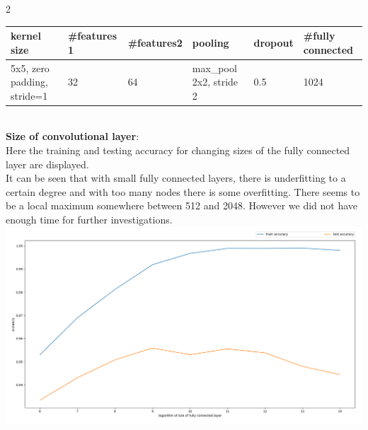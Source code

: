 \documentclass{article}
\begin{document}
\begin{ukon-infie}[3.12.17]{2}
\begin{exercise}[p=55]{}
{\begin{tabular}{|l|l|l|l|l|l|}
\hline
kernel size                 & \#features  1 & \#features2 & pooling                 & dropout & \#fully connected \\ \hline
5x5, zero padding, stride=1 & 32            & 64          & max\_pool 2x2, stride 2 & 0.5     & 1024              \\ \hline
\end{tabular} \\
			
			\textbf{Size of convolutional layer}:\\
			Here the training and testing accuracy for changing sizes of the fully connected layer are displayed. \\
			It can be seen that with small fully connected layers, there is underfitting to a certain degree and with too many nodes there is some overfitting. There seems to be a local maximum somewhere between 512 and 2048. However we did not have enough time for further investigations.\\
			\includegraphics[scale=1.1]{convsize.png}\\
			
}
\end{exercise}
\end{ukon-infie}
\end{document}
